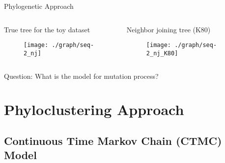 \documentclass{beamer}
\begin{document}
\begin{frame}{Phylogenetic Approach}

\vspace{0.5cm}
\begin{columns}

\begin{column}{0.5\textwidth}
  \begin{center}
  \small True tree for the toy dataset
  \vspace{-0.5cm}
  \begin{figure}
  \texttt{[image: ./graph/seq-2\_nj]}
  \end{figure}
  \end{center}
\end{column}

\hspace{-0.5cm}

\begin{column}{0.5\textwidth}
  \begin{center}
  \small Neighbor joining tree (K80)
  \vspace{-0.5cm}
  \begin{figure}
  \texttt{[image: ./graph/seq-2\_nj\_K80]}
  \end{figure}
  \end{center}
\end{column}

\end{columns}

\begin{center}
\color{mydarkred}
Question: What is the model for mutation process?
\end{center}

\end{frame}


\section{Phyloclustering Approach}

\subsection{Continuous Time Markov Chain (CTMC) Model}
\end{document}
